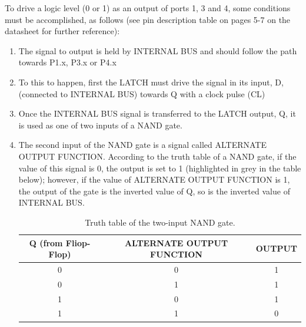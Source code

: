 \documentclass[10pt, letterpaper]{article}
\begin{document}
To drive a logic level (0 or 1) as an output of ports 1, 3 and 4, some conditions must be accomplished, as follows (see pin description table on pages 5-7 on the datasheet for further reference):
\begin{enumerate}
\item The signal to output is held by INTERNAL BUS and should follow the path towards P1.x, P3.x or P4.x
\item To this to happen, first the LATCH must drive the signal in its input, D, (connected to INTERNAL BUS) towards Q with a clock pulse (CL)
\item Once the INTERNAL BUS signal is transferred to the LATCH output, Q, it is used as one of two inputs of a NAND gate. 
\item The second input of the NAND gate is a signal called ALTERNATE OUTPUT FUNCTION. According to the truth table of a NAND gate, if the value of this signal is 0, the output is set to 1 (highlighted in grey in the table below); however, if the value of ALTERNATE OUTPUT FUNCTION is 1, the output of the gate is the inverted value of Q, so is the inverted value of INTERNAL BUS. 

\begin{table}[h!]
	\begin{center}
		\begin{tabular}{| c c | c |}
			\hline
			Q (from Fliop-Flop) & ALTERNATE OUTPUT FUNCTION & OUTPUT \\
			\hline
			0 & 0 & 1 \\
			0 & 1 & 1 \\
			1 & 0 & 1 \\
			1 & 1 & 0 \\
			\hline
		\end{tabular}
	\end{center}
	\caption{Truth table of the two-input NAND gate.}
\end{table}


\end{enumerate}
\end{document}
